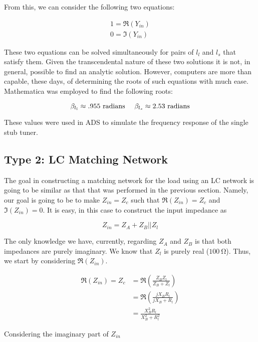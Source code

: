 From this, we can consider the following two equations:

\begin{align*}
    1 = \Re \left( Y_{in} \right) \\
    0 = \Im \left( Y_{in} \right)
\end{align*}

These two equations can be solved simultaneously for pairs of $l_l$ and $l_s$
that satisfy them. Given the transcendental nature of these two solutions it is
not, in general, possible to find an analytic solution. However, computers are
more than capable, these days, of determining the roots of such equations with
much ease. Mathematica was employed to find the following roots:

\[ 
        \beta_{l_l} \approx .955~\text{radians \quad} \beta_{l_s} \approx
        2.53~\text{radians}
\]

These values were used in ADS to simulate the frequency response of the single
stub tuner.


\subsection{Type 2: LC Matching Network}
The goal in constructing a matching network for the load using an LC network is
going to be similar as that that was performed in the previous section. Namely,
our goal is going to be to make $Z_{in} = Z_c$ such that $\Re \left( Z_{in}
\right) = Z_c$ and $\Im \left( Z_{in} \right) = 0$. It is easy, in this case to
construct the input impedance as 

\[ 
        Z_{in} = Z_A + Z_B || Z_l 
\]

The only knowledge we have, currently, regarding $Z_A$ and $Z_B$ is that both
impedances are purely imaginary. We know that $Z_l$ is purely real ($
\SI{100}{\ohm}$). Thus, we start by considering $\Re \left( Z_{in} \right)$.

\begin{align*}
    \Re(Z_{in}) = Z_c &= \Re ( \frac{Z_B Z_l}{Z_B + Z_l} )\\
                      &= \Re ( \frac{j X_B R_l}{j X_B + R_l} ) \\
                      &= \frac{ X_B^2 R_l}{X_B^2 + R_l^2}
\end{align*}

Considering the imaginary part of $Z_{in}$

